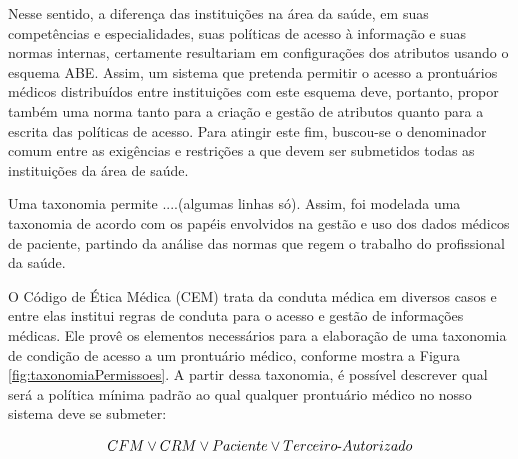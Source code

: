 \documentclass[a4paper,11pt]{article}
\begin{document}
Nesse sentido, a diferença das instituições na área da saúde, em suas competências e especialidades,  suas políticas de acesso à informação e suas normas internas, certamente resultariam em configurações dos atributos usando o esquema ABE.
Assim, um sistema que pretenda permitir o acesso a prontuários médicos distribuídos entre instituições com este esquema deve, portanto, propor também uma norma tanto para a criação e gestão de atributos quanto para a escrita das políticas de acesso.
Para atingir este fim, buscou-se o denominador comum entre as exigências e restrições a que devem ser submetidos todas as instituições da área de saúde.

{\color{magenta}Uma taxonomia permite ....(algumas linhas só)}. Assim, foi modelada uma taxonomia de acordo com os papéis envolvidos na gestão e uso dos dados médicos de paciente, partindo da análise das normas que regem o trabalho do profissional da saúde.

O Código de Ética Médica (CEM) trata da conduta médica em diversos casos e entre elas institui regras de conduta para o acesso e gestão de informações médicas. Ele provê os elementos necessários para a elaboração de uma taxonomia de condição de acesso a um prontuário médico, conforme mostra a Figura \ref{fig:taxonomiaPermissoes}.
A partir dessa taxonomia, é possível descrever qual será a política mínima padrão ao qual qualquer prontuário médico {\color{blue}no nosso sistema} deve se submeter:

\[ CFM \vee CRM \vee Paciente \vee Terceiro\textnormal{-}Autorizado \]



\end{document}
